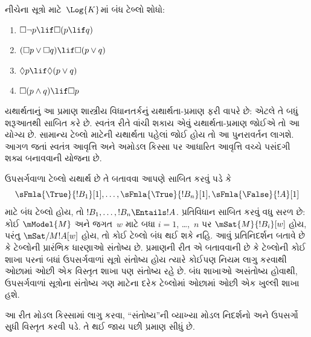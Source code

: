 \begin{prob}
  નીચેના સૂત્રો માટે~$\Log{K}$માં બંધ ટેબ્લો શોધો:
  \begin{enumerate}
    \item $\Box \lnot p \lif \Box(p \lif q)$
    \item $(\Box p \lor \Box q) \lif \Box(p \lor q)$
    \item $\Diamond p \lif \Diamond(p \lor q)$
    \item $\Box(p \land q) \lif \Box p$
  \end{enumerate}
\end{prob}
\endgroup

\begingroup
\makeatletter{}\makeatother


\label{guunit:OLP-0464}


\begin{editorial}
  યથાર્થતાનું આ પ્રમાણ શાસ્ત્રીય વિધાનતર્કનું યથાર્થતા-પ્રમાણ ફરી
  વાપરે છે: એટલે તે બધું શરૂઆતથી સાબિત કરે છે. સ્વતંત્ર રીતે
  વાંચી શકાય એવું યથાર્થતા-પ્રમાણ જોઈએ તો આ યોગ્ય છે. સામાન્ય
  ટેબ્લો માટેની યથાર્થતા પહેલાં જોઈ હોય તો આ પુનરાવર્તન લાગશે.
  આગળ જતાં સ્વતંત્ર આવૃત્તિ અને અમોડલ કિસ્સા પર આધારિત આવૃત્તિ
  વચ્ચે પસંદગી શક્ય બનાવવાની યોજના છે.
\end{editorial}

\begin{explain}
  ઉપસર્ગવાળા ટેબ્લો યથાર્થ છે તે બતાવવા આપણે સાબિત કરવું પડે કે
  \[
  \sFmla{\True}{!B_1}[1], \dots, \sFmla{\True}{!B_n}[1], \sFmla{\False}{!A}[1]
  \]
  માટે બંધ ટેબ્લો હોય, તો $!B_1, \dots, !B_n \Entails !A$.
  પ્રતિવિધાન સાબિત કરવું વધુ સરળ છે: કોઈ $\mModel{M}$ અને
  જગત~$w$ માટે બધા $i=1$, \dots,~$n$ પર
  $\mSat{M}{!B_i}[w]$ હોય, પરંતુ
  $\mSat/{M}{!A}[w]$ હોય, તો કોઈ ટેબ્લો બંધ થઈ શકે નહિ.
  આવું પ્રતિનિદર્શન બતાવે છે કે ટેબ્લોની પ્રારંભિક ધારણાઓ
  સંતોષ્ય છે. પ્રમાણની રીત એ બતાવવાની છે કે ટેબ્લોની કોઈ
  શાખા પરનાં બધાં ઉપસર્ગવાળાં સૂત્રો સંતોષ્ય હોય ત્યારે
  કોઈપણ નિયમ લાગુ કરવાથી ઓછામાં ઓછી એક વિસ્તૃત શાખા પણ
  સંતોષ્ય રહે છે. બંધ શાખાઓ અસંતોષ્ય હોવાથી, ઉપસર્ગવાળાં
  સૂત્રોના સંતોષ્ય ગણ માટેના દરેક ટેબ્લોમાં
  ઓછામાં ઓછી એક ખુલ્લી શાખા હશે.

  આ રીત મોડલ કિસ્સામાં લાગુ કરવા, ``સંતોષ્ય''ની વ્યાખ્યા
  મોડલ નિદર્શનો અને ઉપસર્ગો સુધી વિસ્તૃત કરવી પડે. તે થઈ જાય
  પછી પ્રમાણ સીધું છે.
\end{explain}

